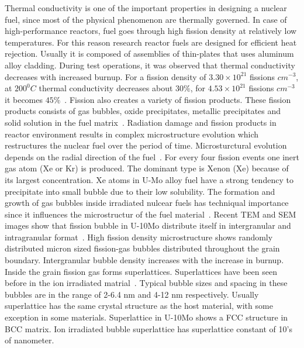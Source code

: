 \begin{doublespacing}
Thermal conductivity is one of the important properties in designing a nuclear fuel, since most of the physical phenomenon are thermally governed. In case of high-performance reactors, fuel goes through high fission density at relatively low temperatures. For this reason research reactor fuels are designed for efficient heat rejection. Usually it is composed of assemblies of thin-plates that uses aluminum alloy cladding. During test operations, it was observed that thermal conductivity decreases with increased burnup. For a fission density of $3.30\times10^{21}$ fissions $cm^{-3}$, at $200^0C$ thermal conductivity decreases about $30\%$, for $4.53\times10^{21}$ fissions $cm^{-3}$ it becomes $45\%$~\cite{burkes2015thermal}. Fission also creates a variety of fission products. These fission products consists of gas bubbles, oxide precipitates, metallic precipitates and solid solution in the fuel matrix~\cite{rondinella2010high}. Radiation damage and fission products in reactor environment results in complex microstructure evolution which restructures the nuclear fuel over the period of time. Microsturctural evolution depends on the radial direction of the fuel~\cite{stehle1988performance,noirot2008detailed, meyer2014irradiation}. For every four fission events one inert gas atom (Xe or Kr) is produced. The dominant type is Xenon (Xe) because of its largest concentration. Xe atoms in U-Mo alloy fuel have a strong tendency to precipitate into small bubble due to their low solubility. The formation and growth of gas bubbles inside irradiated nulcear fuels has techniqual importance since it  influences the microstructur of the fuel material~\cite{kim2011fission}. Recent TEM and SEM images show that fission bubble in U-10Mo distribute itself in intergranular and intragranular format~\cite{miller2015transmission,miller2012advantages, gan2010transmission, gan2012tem}. High fission density microstructure shows randomly distributed micron sized fission-gas bubbles distributed throughout the grain boundary. Intergranular bubble density increases with the increase in burnup. Inside the grain fission gas forms superlattices. Superlattices have been seen before in the ion irradiated matrial~\cite{mazey1986bubble, johnson2006helium, johnson1991image, evans1986solid, johnson1980gas, johnson1980hydrogen, lawson1998temperature, evans1983void, johnson1995gas, ghoniem2001theory}. Typical bubble sizes and spacing in these bubbles are in the range of 2-6.4 nm and 4-12 nm respectively. Usually superlattice has the same crystal structure as the host material, with some exception in some materials. Superlattice in U-10Mo shows a FCC structure in BCC matrix. Ion irradiated bubble superlattice has superlattice constant of 10's of nanometer.


\end{doublespacing}

